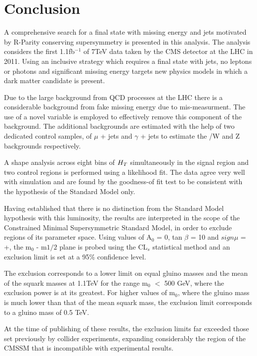 \chapter{Conclusion}
\label{ch:conclusion}

A comprehensive search for a final state with missing energy and jets motivated by R-Parity conserving supersymmetry is presented in this analysis. The analysis considers the first 1.1fb$^{-1}$ of 7TeV data taken by the CMS detector at the LHC in 2011. Using an inclusive strategy which requires a final state with jets, no leptons or photons and significant missing energy targets new physics models in which a dark matter candidate is present. 

Due to the large background from QCD processes at the LHC there is a considerable background from fake missing energy due to mis-measurment. The use of a novel variable \alt is employed to effectively remove this component of the background. The additional backgrounds are estimated with the help of two dedicated control samples, of $\mu$ + jets and $\gamma$ + jets to estimate the \tto/W and Z backgrounds respectively.  


 A shape analysis across eight bins of $H_{T} $ simultaneously in the signal region and two control regions is performed using a likelihood fit. The data agree very well with simulation and are found by the goodness-of fit test to be consistent with the hypothesis of the Standard Model only. 

Having established that there is no distinction from the Standard Model hypothesis with this luminosity, the results are interpreted in the scope of the Constrained Minimal Supersymmetric Standard Model, in order to exclude regions of its parameter space. Using values of A$_{0}$ = 0, tan $\beta$ = 10 and $sign{\mu}$ = +, the m$_{0}$ - m${1/2}$ plane is probed using the CL$_{s}$ statistical method and an exclusion limit is set at a 95\% confidence level. 

The exclusion corresponds to a lower limit on equal gluino masses and the mean of the squark  masses at 1.1TeV for the range m$_{0}$ $<$ 500 GeV, where the exclusion power is at its greatest. For higher values of m$_{0}$, where the gluino mass is much lower than that of the mean squark mass, the exclusion limit corresponds to a gluino mass of 0.5 TeV. 

At the time of publishing of these results, the exclusion limits far exceeded those set previously by collider experiments, expanding considerably the region of the CMSSM that is incompatible with experimental results.  

